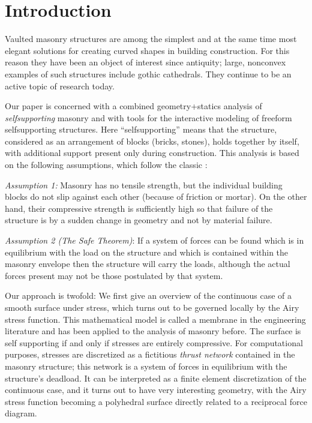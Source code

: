 \documentclass[annual]{acmsiggraph}
\begin{document}

\copyrightspace



\section{Introduction}


Vaulted masonry structures are among the simplest and at the same time
most elegant solutions for creating curved shapes in building
construction. For this reason they have been an object of interest
since antiquity; large, non\dash convex examples of such structures include gothic
cathedrals. They continue to be an active topic of research today.


Our paper is concerned with a combined geometry+statics analysis of {\em
self\dash supporting} masonry and with tools for the interactive modeling
of freeform self\dash supporting structures. Here ``self\dash supporting''
means that the structure, considered as an arrangement of blocks (bricks,
stones), holds together by itself, with additional support present only during
construction. This analysis is based on the following assumptions, which
follow the classic \cite{Heyman66}:


{\it Assumption 1:} Masonry has no tensile strength, but the individual
building blocks do not slip against each other (because of friction or
mortar). On the other hand, their compressive strength is sufficiently
high so that failure of the structure is by a sudden change in geometry
and not by material failure.

{\it Assumption 2 (The Safe Theorem)}: If a system of forces can be found
which is in equilibrium with the load on the structure and which is
contained within the masonry envelope then the structure will carry the
loads, although the actual forces present may not be those postulated by
that system.

Our approach is twofold: We first give an overview of the continuous case
of a smooth surface under stress, which turns out to be governed locally by the
Airy stress function. This mathematical
model is called a membrane in the engineering literature and has been
applied to the analysis of masonry before. The surface is self\dash
supporting if and only if stresses are entirely compressive.
For computational purposes, stresses are
discretized as a fictitious {\em thrust network} \cite{Block07} contained
in the masonry structure; this network is a system of forces in equilibrium with
the structure's deadload. It can be interpreted as a
finite element discretization of the continuous case, and it turns out to
have very interesting geometry, with the Airy stress function becoming a
polyhedral surface directly related to a reciprocal force diagram.
\end{document}
